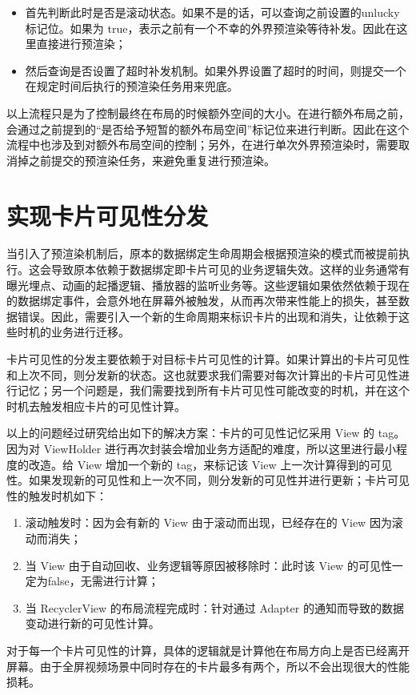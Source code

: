 \begin{itemize}
    \item 首先判断此时是否是滚动状态。如果不是的话，可以查询之前设置的unlucky 标记位。如果为 true，表示之前有一个不幸的外界预渲染等待补发。因此在这里直接进行预渲染；
    \item 然后查询是否设置了超时补发机制。如果外界设置了超时的时间，则提交一个在规定时间后执行的预渲染任务用来兜底。
\end{itemize}

以上流程只是为了控制最终在布局的时候额外空间的大小。在进行额外布局之前，会通过之前提到的“是否给予短暂的额外布局空间”标记位来进行判断。因此在这个流程中也涉及到对额外布局空间的控制；另外，在进行单次外界预渲染时，需要取消掉之前提交的预渲染任务，来避免重复进行预渲染。


\section{实现卡片可见性分发}

当引入了预渲染机制后，原本的数据绑定生命周期会根据预渲染的模式而被提前执行。这会导致原本依赖于数据绑定即卡片可见的业务逻辑失效。这样的业务通常有曝光埋点、动画的起播逻辑、播放器的监听业务等。这些逻辑如果依然依赖于现在的数据绑定事件，会意外地在屏幕外被触发，从而再次带来性能上的损失，甚至数据错误。因此，需要引入一个新的生命周期来标识卡片的出现和消失，让依赖于这些时机的业务进行迁移。

卡片可见性的分发主要依赖于对目标卡片可见性的计算。如果计算出的卡片可见性和上次不同，则分发新的状态。这也就要求我们需要对每次计算出的卡片可见性进行记忆；另一个问题是，我们需要找到所有卡片可见性可能改变的时机，并在这个时机去触发相应卡片的可见性计算。

以上的问题经过研究给出如下的解决方案：卡片的可见性记忆采用 View 的 tag。因为对 ViewHolder 进行再次封装会增加业务方适配的难度，所以这里进行最小程度的改造。给 View 增加一个新的 tag，来标记该 View 上一次计算得到的可见性。如果发现新的可见性和上一次不同，则分发新的可见性并进行更新；卡片可见性的触发时机如下：

\begin{enumerate}
    \item 滚动触发时：因为会有新的 View 由于滚动而出现，已经存在的 View 因为滚动而消失；
    \item 当 View 由于自动回收、业务逻辑等原因被移除时：此时该 View 的可见性一定为false，无需进行计算；
    \item 当 RecyclerView 的布局流程完成时：针对通过 Adapter 的通知而导致的数据变动进行新的可见性计算。
\end{enumerate}

对于每一个卡片可见性的计算，具体的逻辑就是计算他在布局方向上是否已经离开屏幕。由于全屏视频场景中同时存在的卡片最多有两个，所以不会出现很大的性能损耗。